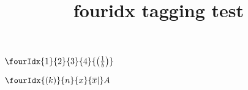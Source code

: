 \documentclass{article}
\title{fouridx tagging test}
\begin{document}
$\fourIdx{1}{2}{3}{4}{\left(\frac{1}{b}\right)}$

$\fourIdx{(k)}{n}{x}{\overline x\vert}A$
\end{document}
